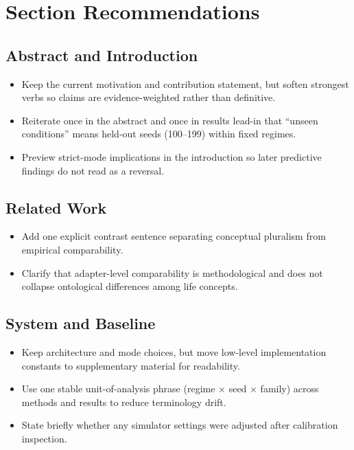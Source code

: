\documentclass[11pt]{article}
\begin{document}
\section*{Section Recommendations}

\subsection*{Abstract and Introduction}
\begin{itemize}
  \item Keep the current motivation and contribution statement, but soften strongest verbs so claims are evidence-weighted rather than definitive.
  \item Reiterate once in the abstract and once in results lead-in that ``unseen conditions'' means held-out seeds (100--199) within fixed regimes.
  \item Preview strict-mode implications in the introduction so later predictive findings do not read as a reversal.
\end{itemize}

\subsection*{Related Work}
\begin{itemize}
  \item Add one explicit contrast sentence separating conceptual pluralism from empirical comparability.
  \item Clarify that adapter-level comparability is methodological and does not collapse ontological differences among life concepts.
\end{itemize}

\subsection*{System and Baseline}
\begin{itemize}
  \item Keep architecture and mode choices, but move low-level implementation constants to supplementary material for readability.
  \item Use one stable unit-of-analysis phrase (regime $\times$ seed $\times$ family) across methods and results to reduce terminology drift.
  \item State briefly whether any simulator settings were adjusted after calibration inspection.
\end{itemize}
\end{document}
